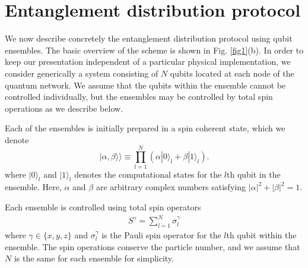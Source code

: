 \documentclass[%
  prx,%
  twocolumn,%
  preprintnumbers,%
  amsmath,%
  amssymb,%
  superscriptaddress%
]{revtex4}
\begin{document}
\section{Entanglement distribution protocol}

We now describe concretely the entanglement distribution protocol using qubit ensembles. The basic overview of the scheme is shown in Fig. \ref{fig1}(b).  In order to keep our presentation independent of a particular physical implementation, we consider generically a system consisting of $ N $ qubits located at each node of the quantum network.  We assume that the qubits within the ensemble cannot be controlled individually, but the ensembles may be controlled by total spin operations as we describe below.

Each of the ensembles is initially prepared in a spin coherent state, which we denote
%
\begin{equation}
\label{ensemblequbit}
|\alpha,\beta\rangle\rangle\equiv \prod_{l=1}^N (\alpha |0\rangle_l +\beta |1 \rangle_l).
\end{equation}
%
where $ |0\rangle_l $ and $ |1\rangle_l $ denotes the computational states for the $l$th qubit in the ensemble.  Here, $\alpha$ and $\beta$ are arbitrary complex numbers satisfying $|\alpha|^2+|\beta|^2=1$.

Each ensemble is controlled using total spin operators
%
\begin{align}
S^\gamma = \sum_{l=1}^N \sigma_l^\gamma
\end{align}
%
where $\gamma \in\{ x, y, z \} $ and $ \sigma_l^\gamma $ is the Pauli spin operator for the $ l $th qubit within the ensemble.  The spin operations conserve the particle number, and we assume that $ N $ is the same for each ensemble for simplicity.
\end{document}
